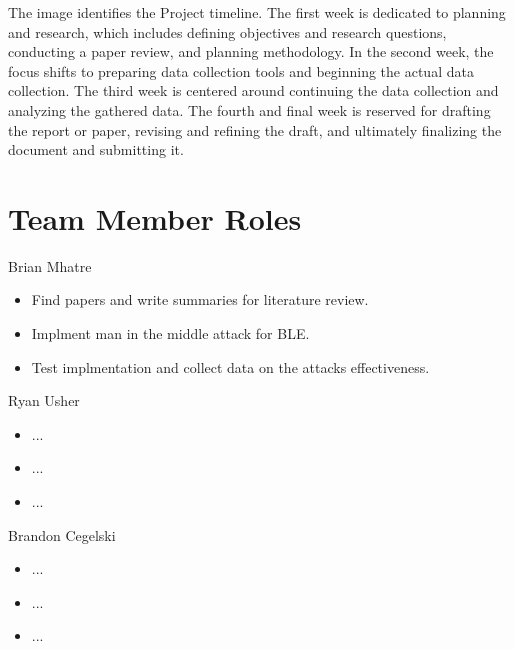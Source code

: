 \documentclass{article}
\begin{document}
    The image identifies the Project timeline. The first week is dedicated to planning and research, which includes defining objectives and research questions, conducting a paper review, and planning methodology. In the second week, the focus shifts to preparing data collection tools and beginning the actual data collection. The third week is centered around continuing the data collection and analyzing the gathered data. The fourth and final week is reserved for drafting the report or paper, revising and refining the draft, and ultimately finalizing the document and submitting it.
\section{Team Member Roles}
Brian Mhatre 
\begin{itemize}
    \item Find papers and write summaries for literature review.
    \item Implment man in the middle attack for BLE.
    \item Test implmentation and collect data on the attacks effectiveness.
\end{itemize}
Ryan Usher
\begin{itemize}
    \item ...
    \item ...
    \item ...
\end{itemize}

Brandon Cegelski 
\begin{itemize}
    \item ...
    \item ...
    \item ...
\end{itemize}
\end{document}
